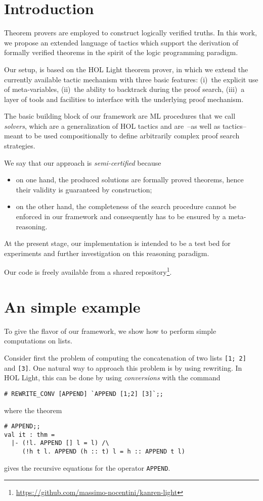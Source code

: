 
\section{Introduction}
\label{sec:introduction}

Theorem provers are employed to construct logically verified truths.
In this work, we propose an extended language of tactics which support
the derivation of formally verified theorems in the spirit of the
logic programming paradigm.

Our setup, is based on the HOL Light theorem prover, in which we
extend the currently available tactic mechanism with three basic
features: (i)~the explicit use of meta-variables, (ii)~the ability to
backtrack during the proof search, (iii)~a layer of tools and
facilities to interface with the underlying proof mechanism.

The basic building block of our framework are ML procedures that we
call \emph{solvers}, which are a generalization of HOL tactics and
are~--as well as tactics-- meant to be used compositionally to define
arbitrarily complex proof search strategies.

We say that our approach is \emph{semi-certified} because
\begin{itemize}
\item on one hand, the produced solutions are formally proved
  theorems, hence their validity is guaranteed by construction;
\item on the other hand, the completeness of the search procedure
  cannot be enforced in our framework and consequently has to be
  ensured by a meta-reasoning.
\end{itemize}

At the present stage, our implementation is intended to be a test bed
for experiments and further investigation on this reasoning paradigm.

Our code is freely available from a shared
repository\footnote{\url{https://github.com/massimo-nocentini/kanren-light}}.

\section{An simple example}
\label{sec:an-simple-example}

To give the flavor of our framework, we show how to perform simple
computations on lists.

Consider first the problem of computing the concatenation of two lists
\verb|[1; 2]| and \verb|[3]|.  One natural way to approach this
problem is by using rewriting.  In HOL Light, this can be done by using
\emph{conversions} with the command
\begin{verbatim}
# REWRITE_CONV [APPEND] `APPEND [1;2] [3]`;;
\end{verbatim}
where the theorem
\begin{verbatim}
# APPEND;;
val it : thm =
  |- (!l. APPEND [] l = l) /\
     (!h t l. APPEND (h :: t) l = h :: APPEND t l)
\end{verbatim}
gives the recursive equations for the operator \verb|APPEND|.

